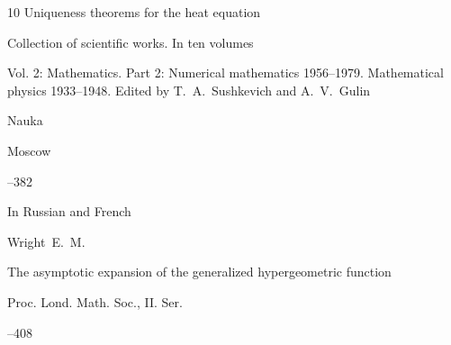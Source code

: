 \begin{thebibliography}{10}
\paper Uniqueness theorems for the heat equation

\inbook Collection of scientific works. In ten volumes

\volinfo Vol. 2: Mathematics. Part 2: Numerical mathematics 1956–1979. Mathematical physics 1933–1948. Edited by T.~A.~Sushkevich and  A.~V.~Gulin


\publ Nauka

\publaddr Moscow

--382


\lang In Russian and French






\by Wright~E.~M.

\paper The asymptotic expansion of the generalized hypergeometric function

\jour Proc. Lond. Math. Soc., II. Ser. 




--408













\end{thebibliography}



%

